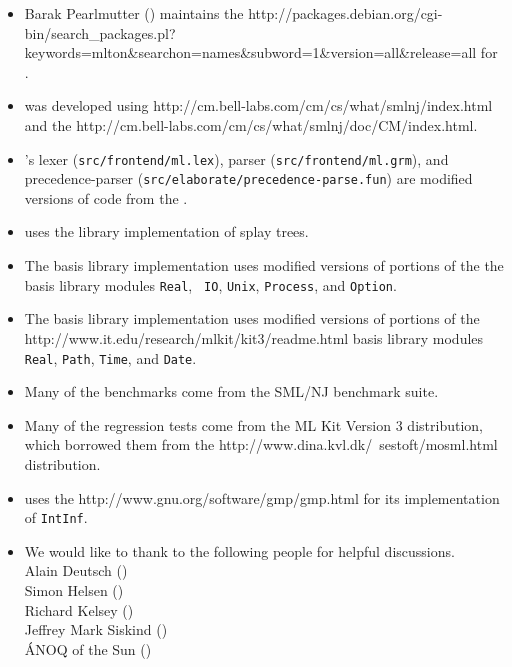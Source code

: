 \begin{itemize}
\item
Barak Pearlmutter () maintains the
		  {http://packages.debian.org/cgi-bin/search_packages.pl?keywords=mlton&searchon=names&subword=1&version=all&release=all}
for {\mlton}.

\item
{\mlton} was developed using
		  {http://cm.bell-labs.com/cm/cs/what/smlnj/index.html}
and the
		  {http://cm.bell-labs.com/cm/cs/what/smlnj/doc/CM/index.html}.

\item
{\mlton}'s lexer ({\tt src/frontend/ml.lex}), 
parser ({\tt src/frontend/ml.grm}),
and precedence-parser ({\tt src/elaborate/precedence-parse.fun})
are modified versions of code from the {\smlnj}.

\item
{\mlton} uses the {\smlnj} library implementation of splay trees.

\item
The {\mlton} basis library implementation uses modified versions of
portions of the the {\smlnj} basis library modules {\tt Real}, {\tt
IO}, {\tt Unix}, {\tt Process}, and {\tt Option}.

\item
The {\mlton} basis library implementation uses modified versions of
portions of the
		  {http://www.it.edu/research/mlkit/kit3/readme.html}
basis library modules {\tt Real}, {\tt Path}, {\tt Time}, and
{\tt Date}.

\item
Many of the benchmarks come from the SML/NJ benchmark suite.

\item
Many of the regression tests come from the ML Kit Version 3 distribution, which
borrowed them from the
		  {http://www.dina.kvl.dk/~sestoft/mosml.html}
distribution.

\item
{\mlton} uses the
		  {http://www.gnu.org/software/gmp/gmp.html}
for its implementation of {\tt IntInf}.

\item
We would like to thank to the following people for helpful discussions.\\
\hspace*{2em}Alain Deutsch ()\\
\hspace*{2em}Simon Helsen ()\\
\hspace*{2em}Richard Kelsey ()\\
\hspace*{2em}Jeffrey Mark Siskind ()\\
\hspace*{2em}\'{A}NOQ of the Sun ()
\end{itemize}
